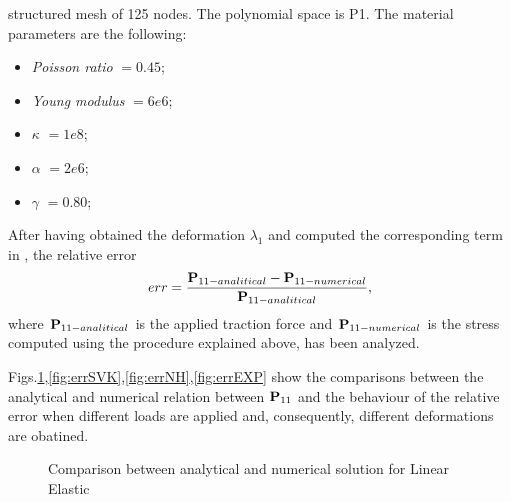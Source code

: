 structured mesh of 125 nodes. The polynomial space is P1. The material
parameters are the following:
\begin{itemize}
  \item \textit{Poisson ratio} $= 0.45$;
  \item \textit{Young modulus} $= 6e6$;
  \item $\kappa$ $=1e8$;
  \item $\alpha$ $=2e6$;
  \item $\gamma$ $=0.80$;
\end{itemize} After having obtained the deformation $\lambda_1$ and
computed the corresponding term in \Piola, the relative error
\begin{equation} err = \displaystyle
\frac{\textbf{P}_{11-analitical}-\textbf{P}_{11-numerical}}{\textbf{P}_{11-analitical}},
\end{equation} where $\textbf{P}_{11-analitical}$ is the applied traction
force and $\textbf{P}_{11-numerical}$ is the stress computed using the
procedure explained above, has been analyzed.

Figs.\ref{fig:errLE},\ref{fig:errSVK},\ref{fig:errNH},\ref{fig:errEXP}
show the comparisons between the analytical and numerical relation
between $\textbf{P}_{11}$ and the behaviour of the relative error when
different loads are applied and, consequently, different deformations
are obatined.

\begin{figure}[h!]  \centering {}
\caption{Comparison between analytical and numerical solution for
Linear Elastic}
\label{fig:errLE}
\end{figure}

